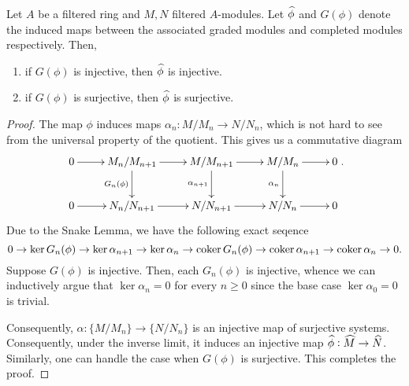 \begin{lemma}
    Let $A$ be a filtered ring and $M,N$ filtered $A$-modules. Let $\widehat{\phi}$ and $G(\phi)$ denote the induced maps between the associated graded modules and completed modules respectively. Then, 
    \begin{enumerate}[label=(\alph*)]
        \item if $G(\phi)$ is injective, then $\widehat{\phi}$ is injective.
        \item if $G(\phi)$ is surjective, then $\widehat{\phi}$ is surjective.
    \end{enumerate}
\end{lemma}
\begin{proof}
    The map $\phi$ induces maps $\alpha_n: M/M_n\to N/N_n$, which is not hard to see from the universal property of the quotient. This gives us a commutative diagram 
    \begin{equation*}
        \xymatrix {
            0\ar[r] & M_n/M_{n + 1}\ar[d]_{G_n(\phi)}\ar[r] & M/M_{n + 1}\ar[d]_{\alpha_{n + 1}}\ar[r] & M/M_{n}\ar[d]_{\alpha_n}\ar[r] & 0\\
            0\ar[r] & N_n/N_{n + 1}\ar[r] & N/N_{n + 1}\ar[r] & N/N_{n}\ar[r] & 0
        }.
    \end{equation*}
    Due to the Snake Lemma, we have the following exact seqence 
    \begin{equation*}
        0\rightarrow\ker G_n(\phi)\rightarrow\ker\alpha_{n + 1}\rightarrow\ker\alpha_n\rightarrow\operatorname{coker} G_n(\phi)\rightarrow\operatorname{coker}\alpha_{n + 1}\rightarrow\operatorname{coker}\alpha_n\rightarrow 0.
    \end{equation*}
    Suppose $G(\phi)$ is injective. Then, each $G_n(\phi)$ is injective, whence we can inductively argue that $\ker\alpha_n = 0$ for every $n\ge 0$ since the base case $\ker\alpha_0 = 0$ is trivial.

    Consequently, $\alpha: \{M/M_n\}\to\{N/N_n\}$ is an injective map of surjective systems. Consequently, under the inverse limit, it induces an injective map $\widehat{\phi}:\widehat{M}\to\widehat{N}$. Similarly, one can handle the case when $G(\phi)$ is surjective. This completes the proof.
\end{proof}

